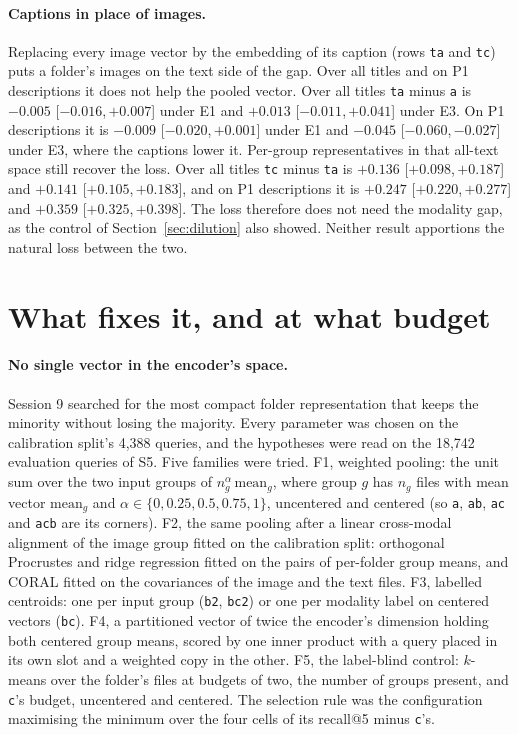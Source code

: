 \documentclass[11pt]{article}
\newcommand{\rep}[1]{\texttt{#1}}
\newcommand{\ci}[2]{[\ensuremath{#1},\,\ensuremath{#2}]}  %
\begin{document}
\paragraph{Captions in place of images.} Replacing every image vector by the embedding of its caption (rows \rep{ta} and \rep{tc}) puts a folder's images on the text side of the gap. Over all titles and on P1 descriptions it does not help the pooled vector. Over all titles \rep{ta} minus \rep{a} is $-0.005$ \ci{-0.016}{+0.007} under E1 and $+0.013$ \ci{-0.011}{+0.041} under E3. On P1 descriptions it is $-0.009$ \ci{-0.020}{+0.001} under E1 and $-0.045$ \ci{-0.060}{-0.027} under E3, where the captions lower it. Per-group representatives in that all-text space still recover the loss. Over all titles \rep{tc} minus \rep{ta} is $+0.136$ \ci{+0.098}{+0.187} and $+0.141$ \ci{+0.105}{+0.183}, and on P1 descriptions it is $+0.247$ \ci{+0.220}{+0.277} and $+0.359$ \ci{+0.325}{+0.398}. The loss therefore does not need the modality gap, as the control of Section~\ref{sec:dilution} also showed. Neither result apportions the natural loss between the two.

\section{What fixes it, and at what budget}
\label{sec:remedy}

\paragraph{No single vector in the encoder's space.} Session 9 searched for the most compact folder representation that keeps the minority without losing the majority. Every parameter was chosen on the calibration split's 4,388 queries, and the hypotheses were read on the 18,742 evaluation queries of S5. Five families were tried. F1, weighted pooling: the unit sum over the two input groups of $n_g^{\alpha}\,\mathrm{mean}_g$, where group $g$ has $n_g$ files with mean vector $\mathrm{mean}_g$ and $\alpha \in \{0, 0.25, 0.5, 0.75, 1\}$, uncentered and centered (so \rep{a}, \rep{ab}, \rep{ac} and \rep{acb} are its corners). F2, the same pooling after a linear cross-modal alignment of the image group fitted on the calibration split: orthogonal Procrustes and ridge regression fitted on the pairs of per-folder group means, and CORAL fitted on the covariances of the image and the text files. F3, labelled centroids: one per input group (\rep{b2}, \rep{bc2}) or one per modality label on centered vectors (\rep{bc}). F4, a partitioned vector of twice the encoder's dimension holding both centered group means, scored by one inner product with a query placed in its own slot and a weighted copy in the other. F5, the label-blind control: $k$-means over the folder's files at budgets of two, the number of groups present, and \rep{c}'s budget, uncentered and centered. The selection rule was the configuration maximising the minimum over the four cells of its recall@5 minus \rep{c}'s.
\end{document}
